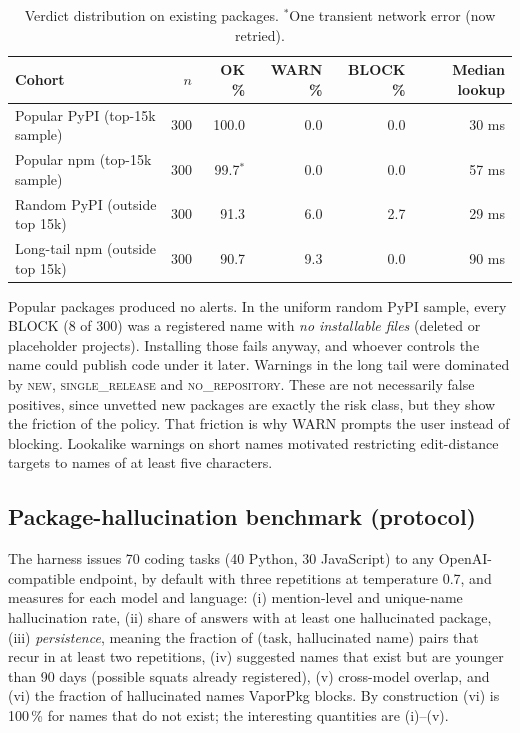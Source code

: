 \documentclass[11pt,a4paper]{article}
\begin{document}
\begin{table}[h]
\centering\small
\begin{tabular}{@{}lrrrrr@{}}
\toprule
Cohort & $n$ & OK \% & WARN \% & BLOCK \% & Median lookup \\ \midrule
Popular PyPI (top-15k sample) & 300 & 100.0 & 0.0 & 0.0 & 30 ms \\
Popular npm (top-15k sample) & 300 & 99.7$^*$ & 0.0 & 0.0 & 57 ms \\
Random PyPI (outside top 15k) & 300 & 91.3 & 6.0 & 2.7 & 29 ms \\
Long-tail npm (outside top 15k) & 300 & 90.7 & 9.3 & 0.0 & 90 ms \\ \bottomrule
\end{tabular}
\caption{Verdict distribution on existing packages. $^*$One transient network error (now retried).}\label{tab:alerts}
\end{table}

Popular packages produced no alerts. In the uniform random PyPI sample, every BLOCK (8 of 300) was a
registered name with \emph{no installable files} (deleted or placeholder projects). Installing those fails
anyway, and whoever controls the name could publish code under it later. Warnings in the long tail were
dominated by \textsc{new}, \textsc{single\_release} and \textsc{no\_repository}. These are not necessarily
false positives, since unvetted new packages are exactly the risk class, but they show the friction of the
policy. That friction is why WARN prompts the user instead of blocking. Lookalike warnings on short
names motivated restricting edit-distance targets to names of at least five characters.

\subsection{Package-hallucination benchmark (protocol)}
The harness issues 70 coding tasks (40 Python, 30 JavaScript) to any OpenAI-compatible endpoint, by default
with three repetitions at temperature 0.7, and measures for each model and language: (i) mention-level and
unique-name hallucination rate, (ii) share of answers with at least one hallucinated package,
(iii) \emph{persistence}, meaning the fraction of (task, hallucinated name) pairs that recur in at least
two repetitions, (iv) suggested names that exist but are younger than 90 days (possible squats already
registered), (v) cross-model overlap, and (vi) the fraction of hallucinated names VaporPkg blocks.
By construction (vi) is 100\,\% for names that do not exist; the interesting quantities are (i)--(v).
\end{document}
